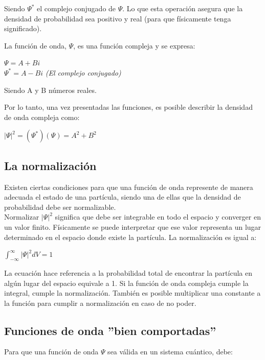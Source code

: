 \documentclass[a4paper]{article}
\begin{document}
        Siendo $\Psi^*$ el complejo conjugado de $\Psi$. Lo que esta operación asegura que la densidad de probabilidad sea positivo y real (para que físicamente tenga significado).

        \indent La función de onda, $\Psi$, es una función compleja y se expresa:
    
        \begin{center}
            $\Psi = A + Bi$ \\
            $\Psi^* = A - Bi$ \hspace{5mm} \textit{(El complejo conjugado)} \\
        \end{center}

        Siendo A y B números reales.

        \indent Por lo tanto, una vez presentadas las funciones, es posible describir la densidad de onda compleja como:

        \begin{center}
            $|\Psi|^2 = (\Psi^*) (\Psi) = A^2 + B^2$
        \end{center}

    \subsection{La normalización}
        \indent Existen ciertas condiciones para que una función de onda represente de manera adecuada el estado de una partícula, siendo una de ellas que la densidad de probabilidad debe ser normalizable. \\
        \indent Normalizar $|\Psi|^2$ significa que debe ser integrable en todo el espacio y converger en un valor finito. Físicamente se puede interpretar que ese valor representa un lugar determinado en el espacio donde existe la partícula. La normalización es igual a:

        \begin{center}
            $\int_{- \infty}^{\infty} |\Psi|^2 dV = 1$ 
        \end{center}

        La ecuación hace referencia a la probabilidad total de encontrar la partícula en algún lugar del espacio equivale a 1. Si la función de onda compleja cumple la integral, cumple la normalización. También es posible multiplicar una constante a la función para cumplir a normalización en caso de no poder.

    \subsection{Funciones de onda ''bien comportadas''}
        \indent Para que una función de onda $\Psi$ sea válida en un sistema cuántico, debe:
\end{document}
